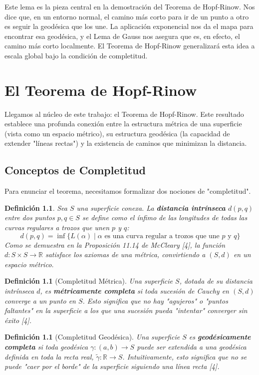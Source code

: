 \documentclass[12pt, a4paper]{report}
\theoremstyle{miestilo}
\theoremstyle{midefinicion}
\newtheorem{definicion}[teorema]{Definición}
\begin{document}
Este lema es la pieza central en la demostración del Teorema de Hopf-Rinow. Nos dice que, en un entorno normal, el camino más corto para ir de un punto a otro es seguir la geodésica que los une. La aplicación exponencial nos da el mapa para encontrar esa geodésica, y el Lema de Gauss nos asegura que es, en efecto, el camino más corto localmente. El Teorema de Hopf-Rinow generalizará esta idea a escala global bajo la condición de completitud.

\chapter{El Teorema de Hopf-Rinow}

Llegamos al núcleo de este trabajo: el Teorema de Hopf-Rinow. Este resultado establece una profunda conexión entre la estructura métrica de una superficie (vista como un espacio métrico), su estructura geodésica (la capacidad de extender "líneas rectas") y la existencia de caminos que minimizan la distancia.

\section{Conceptos de Completitud}

Para enunciar el teorema, necesitamos formalizar dos nociones de "completitud".

\begin{definicion}
Sea $S$ una superficie conexa. La \textbf{distancia intrínseca} $d(p,q)$ entre dos puntos $p, q \in S$ se define como el ínfimo de las longitudes de todas las curvas regulares a trozos que unen $p$ y $q$:
$$ d(p,q) = \inf \{ L(\alpha) \mid \alpha \text{ es una curva regular a trozos que une } p \text{ y } q \} $$
Como se demuestra en la Proposición 11.14 de McCleary [4], la función $d: S \times S \to \mathbb{R}$ satisface los axiomas de una métrica, convirtiendo a $(S,d)$ en un espacio métrico.
\end{definicion}

\begin{definicion}[Completitud Métrica]
Una superficie $S$, dotada de su distancia intrínseca $d$, es \textbf{métricamente completa} si toda sucesión de Cauchy en $(S,d)$ converge a un punto en $S$. Esto significa que no hay "agujeros" o "puntos faltantes" en la superficie a los que una sucesión pueda "intentar" converger sin éxito [4].
\end{definicion}

\begin{definicion}[Completitud Geodésica]
Una superficie $S$ es \textbf{geodésicamente completa} si toda geodésica $\gamma: (a,b) \to S$ puede ser extendida a una geodésica definida en toda la recta real, $\tilde{\gamma}: \mathbb{R} \to S$. Intuitivamente, esto significa que no se puede "caer por el borde" de la superficie siguiendo una línea recta [4].
\end{definicion}
\end{document}
